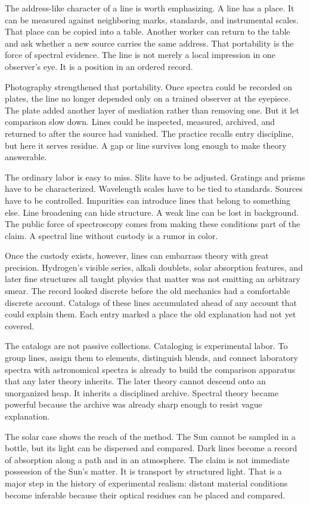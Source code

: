 The address-like character of a line is worth emphasizing. A line has a place.
It can be measured against neighboring marks, standards, and instrumental
scales. That place can be copied into a table. Another worker can return to
the table and ask whether a new source carries the same address. That
portability is the force of spectral evidence. The line is not merely a local
impression in one observer's eye. It is a position in an ordered record.

Photography strengthened that portability. Once spectra could be recorded on
plates, the line no longer depended only on a trained observer at the
eyepiece. The plate added another layer of mediation rather than removing one. But it
let comparison slow down. Lines could be inspected, measured, archived, and
returned to after the source had vanished. The practice recalls entry
discipline, but here it serves residue. A gap or line survives long enough to
make theory answerable.

The ordinary labor is easy to miss. Slits have to be adjusted. Gratings and
prisms have to be characterized. Wavelength scales have to be tied to
standards. Sources have to be controlled. Impurities can introduce lines that belong to
something else. Line broadening can hide structure. A weak line can be lost in
background. The public force of spectroscopy comes from making these
conditions part of the claim. A spectral line without custody is a rumor in
color.

Once the custody exists, however, lines can embarrass theory with great
precision. Hydrogen's visible series, alkali doublets, solar absorption
features, and later fine structures all taught physics that matter was not
emitting an arbitrary smear. The record looked discrete before the old
mechanics had a comfortable discrete account. Catalogs of these lines accumulated
ahead of any account that could explain them. Each entry marked a place the
old explanation had not yet covered.

The catalogs are not passive collections. Cataloging is experimental labor.
To group lines, assign them to elements, distinguish blends, and connect
laboratory spectra with astronomical spectra is already to build the
comparison apparatus that any later theory inherits. The later theory cannot
descend onto an unorganized heap. It inherits a disciplined archive. Spectral theory became
powerful because the archive was already sharp enough to resist vague
explanation.

The solar case shows the reach of the method. The Sun cannot be sampled in a
bottle, but its light can be dispersed and compared. Dark lines become a
record of absorption along a path and in an atmosphere. The claim is not
immediate possession of the Sun's matter. It is transport by structured light.
That is a major step in the history of experimental realism: distant material
conditions become inferable because their optical residues can be placed and
compared.

